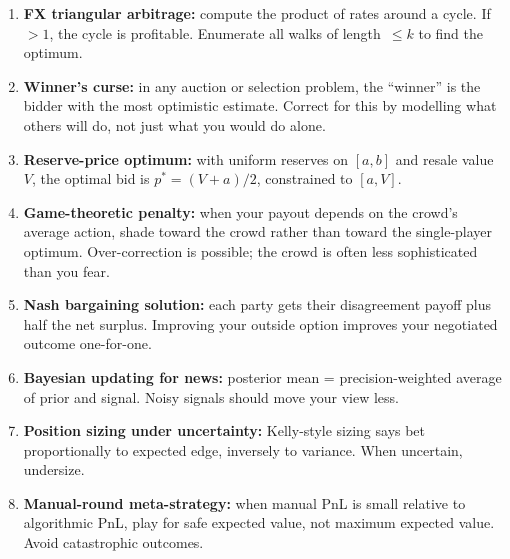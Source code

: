 \begin{enumerate}
  \item \textbf{FX triangular arbitrage:} compute the product of
  rates around a cycle.  If $>1$, the cycle is profitable.
  Enumerate all walks of length~$\le k$ to find the optimum.

  \item \textbf{Winner's curse:} in any auction or selection
  problem, the ``winner'' is the bidder with the most optimistic
  estimate.  Correct for this by modelling what others will do,
  not just what you would do alone.

  \item \textbf{Reserve-price optimum:} with uniform reserves
  on $[a, b]$ and resale value~$V$, the optimal bid is
  $p^* = (V + a)/2$, constrained to $[a, V]$.

  \item \textbf{Game-theoretic penalty:} when your payout depends
  on the crowd's average action, shade toward the crowd rather
  than toward the single-player optimum.  Over-correction is
  possible; the crowd is often less sophisticated than you fear.

  \item \textbf{Nash bargaining solution:} each party gets their
  disagreement payoff plus half the net surplus.  Improving your
  outside option improves your negotiated outcome one-for-one.

  \item \textbf{Bayesian updating for news:} posterior mean =
  precision-weighted average of prior and signal.  Noisy signals
  should move your view less.

  \item \textbf{Position sizing under uncertainty:} Kelly-style
  sizing says bet proportionally to expected edge, inversely to
  variance.  When uncertain, undersize.

  \item \textbf{Manual-round meta-strategy:} when manual PnL is
  small relative to algorithmic PnL, play for safe expected
  value, not maximum expected value.  Avoid catastrophic outcomes.
\end{enumerate}
